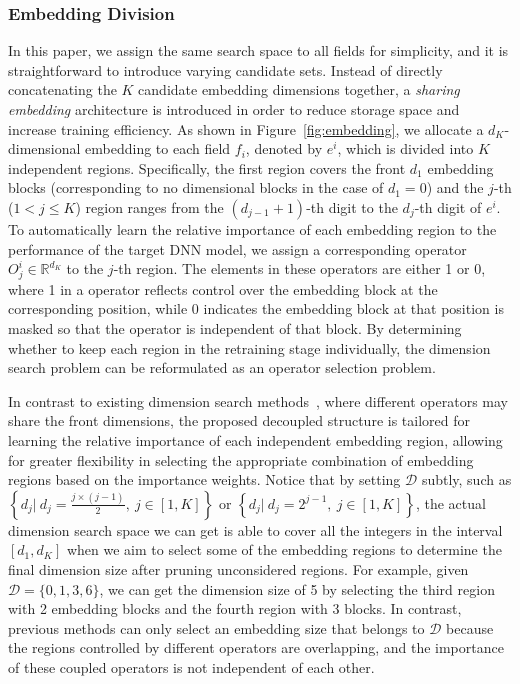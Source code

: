 \documentclass[10pt,journal,compsoc]{IEEEtran}
\begin{document}
\subsubsection{Embedding Division}
In this paper, we assign the same search space to all fields for simplicity, and it is straightforward to introduce varying candidate sets. Instead of directly concatenating the $K$ candidate embedding dimensions together, a \textit{sharing embedding} architecture is introduced in order to reduce storage space and increase training efficiency. %
As shown in Figure~\ref{fig:embedding}, 
{we allocate a $d_K$-dimensional embedding to each field $f_i$, denoted by $e^i$, which is divided into $K$ independent regions. Specifically, the first region covers the front $d_1$ embedding blocks (corresponding to no dimensional blocks in the case of $d_1=0$) and the $j$-th ($1<j\leq K$) region ranges from the $(d_{j-1}+1)$-th digit to the $d_j$-th digit of $e^i$. 
To automatically learn the relative importance of each embedding region to the performance of the target DNN model,
we assign a corresponding operator $O_{j}^i \in \mathbb{R}^{d_K}$  to the $j$-th region. The elements in these operators are either 1 or 0, where {1} in a operator reflects control over the embedding block at the corresponding position, while {0} indicates the embedding block at that position is masked so that the operator is independent of that block.}  
By determining whether to keep each region in the retraining stage individually, the dimension search problem can be reformulated as an operator selection problem. 

In contrast to existing dimension search methods~\cite{zhao2020memory,zhao2020autoemb}, where different operators may share the front dimensions, the proposed decoupled structure is tailored for learning the relative importance of each independent embedding {region}, 
allowing for greater flexibility in selecting the appropriate combination of embedding regions based on the importance weights. Notice that by setting $\mathcal{D}$ subtly, such as $\left\{d_j |\ d_j = \frac{j\times(j-1)}{2},\ j\in \left[1,K\right]\right\}$ or $\left\{d_j |\ d_j = 2^{j-1},\ j\in \left[1,K\right]\right\}$, the actual dimension search space we can get is able to cover all the integers in the interval $\left[d_1, d_K\right]$ when we aim to select some of the embedding regions to determine the final dimension size after pruning unconsidered regions. For example, given $\mathcal{D}=\{0, 1, 3, 6\}$, we can get the dimension size of 5 by selecting the third region with 2 embedding blocks and the fourth region with 3 blocks.
In contrast, previous methods can only select an embedding size that belongs to $\mathcal{D}$ because the regions controlled by different operators are overlapping, and the importance of these coupled operators is not independent of each other.
\end{document}
